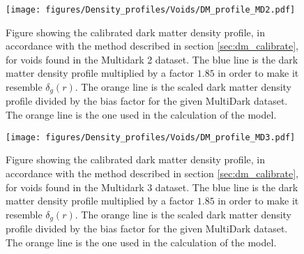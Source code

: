 \begin{figure}[H]
    \texttt{[image: figures/Density\_profiles/Voids/DM\_profile\_MD2.pdf]}
    \caption{Figure showing the calibrated dark matter density profile, in accordance with the method described in section \ref{sec:dm_calibrate}, for voids found in the Multidark 2 dataset. The blue line is the dark matter density profile multiplied by a factor $1.85$ in order to make it resemble $\delta_g(r)$. The orange line is the scaled dark matter density profile divided by the bias factor for the given MultiDark dataset. The orange line is the one used in the calculation of the model.}
    \label{fig:deltadmMD2}
\end{figure}

\begin{figure}[H]
    \texttt{[image: figures/Density\_profiles/Voids/DM\_profile\_MD3.pdf]}
    \caption{Figure showing the calibrated dark matter density profile, in accordance with the method described in section \ref{sec:dm_calibrate}, for voids found in the Multidark 3 dataset. The blue line is the dark matter density profile multiplied by a factor $1.85$ in order to make it resemble $\delta_g(r)$. The orange line is the scaled dark matter density profile divided by the bias factor for the given MultiDark dataset. The orange line is the one used in the calculation of the model.}
    \label{fig:deltadmMD3}
\end{figure}

